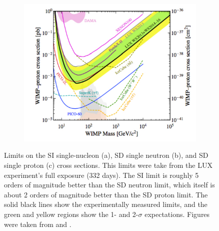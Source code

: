 \begin{figure}
\begin{subfigure}[b]{0.475\textwidth}
        \end{subfigure}
        \quad
        \begin{subfigure}[b]{0.475\textwidth}   
            \centering 
            \includegraphics[width=\textwidth]{Figures/WIMP_proton.pdf}
            \caption{}
            \label{fig:wimplimits_sdp}
        \end{subfigure}
        \caption{Limits on the SI single-nucleon (a), SD single neutron (b), and SD single proton (c) cross sections. This limits were take from the LUX experiment's full exposure (332 days). The SI limit is roughly 5 orders of magnitude better than the SD neutron limit, which itself is about 2 orders of magnitude better than the SD proton limit. The solid black lines show the experimentally measured limits, and the green and yellow regions show the 1- and 2-$\sigma$ expectations. Figures were taken from \cite{lux_2017} and \cite{lux_sd}.}
        \label{fig:wimplimits}
    \end{figure}

